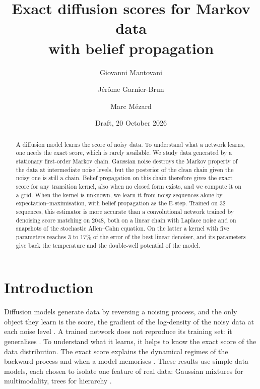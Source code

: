 \documentclass[11pt,a4paper]{article}
\title{Exact diffusion scores for Markov data\\ with belief propagation}
\author{Giovanni Mantovani \and J\'er\^ome Garnier-Brun \and Marc M\'ezard}
\date{Draft, 20 October 2026}
\begin{document}
\maketitle

\begin{abstract}
A diffusion model learns the score of noisy data. To understand what a network learns, one needs the exact score, which is
rarely available. We study data generated by a stationary first-order Markov chain. Gaussian noise destroys the Markov
property of the data at intermediate noise levels, but the posterior of the clean chain given the noisy one is still a chain.
Belief propagation on this chain therefore gives the exact score for any transition kernel, also when no closed form exists,
and we compute it on a grid. When the kernel is unknown, we learn it from noisy sequences alone by expectation--maximisation,
with belief propagation as the E-step. Trained on 32 sequences, this estimator is more accurate than a convolutional network
trained by denoising score matching on 2048, both on a linear chain with Laplace noise and on snapshots of the stochastic
Allen--Cahn equation. On the latter a kernel with five parameters reaches 3 to 17\% of the error of the best linear denoiser,
and its parameters give back the temperature and the double-well potential of the model.
\end{abstract}

\section{Introduction}

Diffusion models generate data by reversing a noising process, and the only object they learn is the score, the gradient of
the log-density of the noisy data at each noise level \citep{sohl2015deep,ho2020denoising,song2021scorebased}. A trained
network does not reproduce its training set: it generalises \citep{kadkhodaie2024generalization}. To understand what it
learns, it helps to know the exact score of the data distribution. The exact score explains the dynamical regimes of the
backward process \citep{biroli2024dynamical} and when a model memorises \citep{bonnaire2025memorize}. These results use
simple data models, each chosen to isolate one feature of real data: Gaussian mixtures for multimodality, trees for
hierarchy \citep{sclocchi2025phase,garnierbrun2024transformers}.
\end{document}
